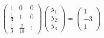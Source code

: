 \documentclass[preview]{standalone}
\begin{document}
\begin{align*}
\begin{pmatrix}1 & 0 & 0 \\\frac{1}{3} & 1 & 0 \\\frac{1}{3} & \frac{2}{10} & 1\end{pmatrix}\begin{pmatrix} y_1 \\ y_2 \\ y_3 \end{pmatrix}= \begin{pmatrix} 1 \\ -3 \\ 1 \end{pmatrix}
\end{align*}
\end{document}
